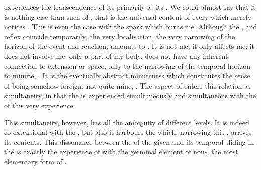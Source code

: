 \pa {} experiences the transcendence of its 
primarily as its .  We could almost say that it is nothing else
than such  of , that  is the
universal content of every  which merely notices .
This is even the case with the spark which burns me. Although the ,
 and {reflex} coincide temporarily, the very localisation, the very
narrowing of the horizon of the event and reaction, amounts to
. It is not me, it only affects me; it does not involve me,
only a part of my body.  does not have any inherent
connection to extension or space, only to the narrowing of the temporal horizon
to  minute, . It is the eventually abstract
minuteness which constitutes the sense of being somehow foreign, not quite mine,
. The aspect of  enters this relation as
simultaneity, in that the  is experienced simultaneously and
 simultaneous with the  of this very experience.

This simultaneity, however, has all the ambiguity of different levels. It is
indeed co-extensional with the \hoa, but also it harbours the  which, narrowing this , arrives  its contents. This
dissonance between the  of the given  and its temporal
sliding in the  is exactly the experience of
 with the germinal element of non-, the most
elementary form of .


